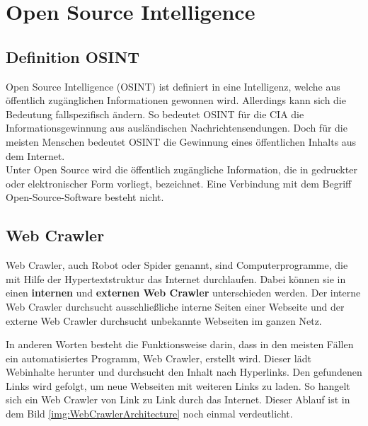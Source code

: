 \section{Open Source Intelligence}
	\subsection{Definition OSINT}
	Open Source Intelligence (OSINT) ist definiert in eine Intelligenz, welche aus öffentlich zugänglichen Informationen gewonnen wird. Allerdings kann sich die Bedeutung fallspezifisch ändern. So bedeutet OSINT für die CIA die Informationsgewinnung aus ausländischen Nachrichtensendungen. Doch für die meisten Menschen bedeutet OSINT die Gewinnung eines öffentlichen Inhalts aus dem Internet. \cite{Bazzell}\\
	Unter Open Source wird die öffentlich zugängliche Information, die in gedruckter oder elektronischer Form vorliegt, bezeichnet.\cite{steele1996open} Eine Verbindung mit dem Begriff Open-Source-Software besteht nicht.
	\subsection{Web Crawler}
		Web Crawler, auch Robot oder Spider genannt, sind Computerprogramme, die mit Hilfe der Hypertextstruktur das Internet durchlaufen. \cite{thelwall2001web} Dabei können sie in einen \textbf{internen} und \textbf{externen Web Crawler} unterschieden werden. Der interne Web Crawler durchsucht ausschließliche interne Seiten einer Webseite und der externe Web Crawler durchsucht unbekannte Webseiten im ganzen Netz. \cite{sharma2012study}

		In anderen Worten besteht die Funktionsweise darin, dass in den meisten Fällen ein automatisiertes Programm, Web Crawler, erstellt wird. Dieser lädt Webinhalte herunter und durchsucht den Inhalt nach Hyperlinks. Den gefundenen Links wird gefolgt, um neue Webseiten mit weiteren Links zu laden. So hangelt sich ein Web Crawler von Link zu Link durch das Internet.\cite{WebScraping} Dieser Ablauf ist in dem Bild \ref{img:WebCrawlerArchitecture} noch einmal verdeutlicht.
		
